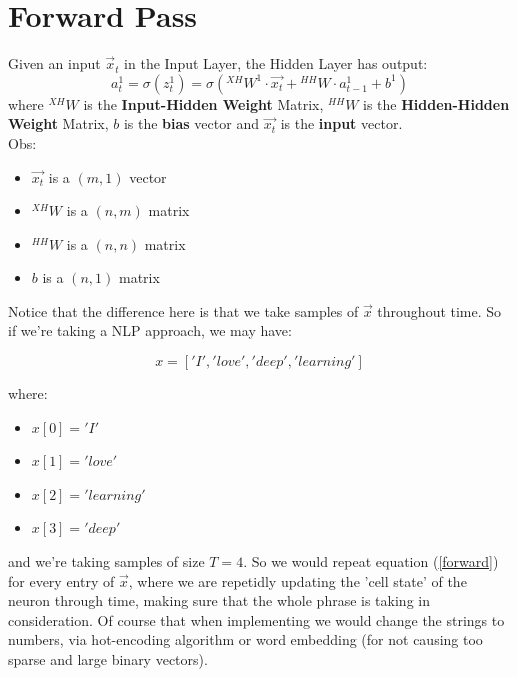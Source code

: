 \documentclass[12pt]{article}
\begin{document}
\section{Forward Pass}

Given an input $\overrightarrow{x}_{t}$ in the Input Layer, the Hidden Layer has output:
\begin{equation}
    a^{1}_{t} = \sigma (z^{1}_{t}) = \sigma({}^{XH}W^{1} \cdot \overrightarrow{x_{t}} + {}^{HH}W \cdot {a^{1}_{t-1}} +  b^{1})
    \label{forward}
\end{equation}
where ${}^{XH}W$ is the \textbf{Input-Hidden Weight} Matrix, ${}^{HH}W$ is the \textbf{Hidden-Hidden Weight} Matrix, $b$ is the \textbf{bias} vector and $\overrightarrow{x_{t}}$ is the \textbf{input} vector.
\\ 
Obs:
\begin{itemize}
    \item $\overrightarrow{x_{t}}$ is a $(m,1)$ vector
    \item ${}^{XH}W$ is a $(n,m)$ matrix
    \item ${}^{HH}W$ is a $(n,n)$ matrix
    \item $b$ is a $(n,1)$ matrix
\end{itemize}

Notice that the difference here is that we take samples of $\overrightarrow{x}$ throughout time. So if we're taking a NLP approach, we may have:

\begin{equation}
    x = ['I', 'love', 'deep', 'learning']
\end{equation}

where:
\begin{itemize}
    \item $x[0] = 'I'$
    \item $x[1] = 'love'$
    \item $x[2] = 'learning'$
    \item $x[3] = 'deep'$
\end{itemize}

and we're taking samples of size $T=4$. So we would repeat equation (\ref{forward}) for every entry of $\overrightarrow{x}$, where we are repetidly updating the 'cell state' of the neuron through time, making sure that the whole phrase is taking in consideration. Of course that when implementing we would change the strings to numbers, via hot-encoding algorithm or word embedding (for not causing too sparse and large binary vectors).
\end{document}
